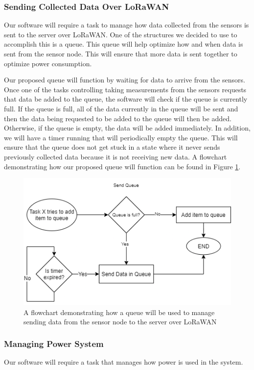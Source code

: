 \subsubsection{Sending Collected Data Over LoRaWAN}
Our software will require a task to manage how data collected from the sensors is sent to the server over LoRaWAN. One of the structures we decided to use to accomplish this is a queue. This queue will help optimize how and when data is sent from the sensor node. This will ensure that more data is sent together to optimize power consumption.

Our proposed queue will function by waiting for data to arrive from the sensors. Once one of the tasks controlling taking measurements from the sensors requests that data be added to the queue, the software will check if the queue is currently full. If the queue is full, all of the data currently in the queue will be sent and then the data being requested to be added to the queue will then be added. Otherwise, if the queue is empty, the data will be added immediately. In addition, we will have a timer running that will periodically empty the queue. This will ensure that the queue does not get stuck in a state where it never sends previously collected data because it is not receiving new data. A flowchart demonstrating how our proposed queue will function can be found in Figure \ref{fig:queue-diagram}.

\begin{figure}[H]
    \centering
    \includegraphics[width=6in]{figures/queue-diagram.png}
    \caption{A flowchart demonstrating how a queue will be used to manage sending data from the sensor node to the server over LoRaWAN}
    \label{fig:queue-diagram} 
\end{figure}

\subsubsection{Managing Power System}
Our software will require a task that manages how power is used in the system.